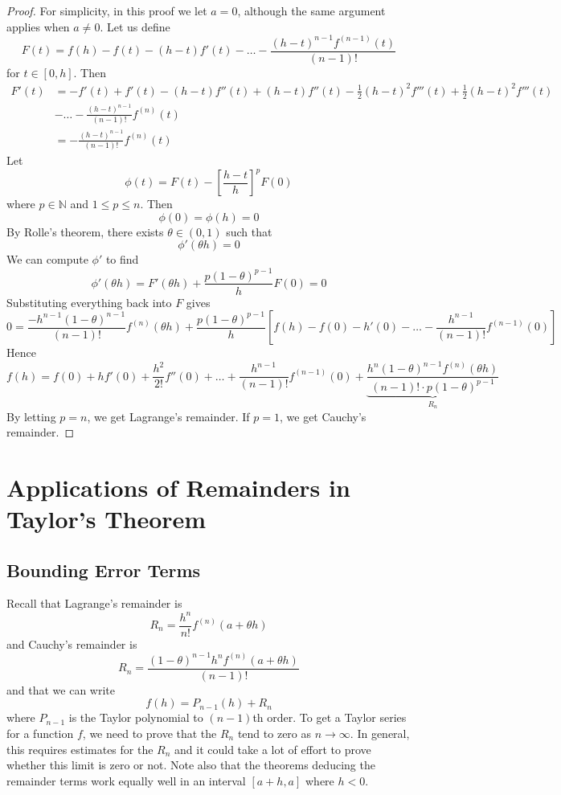 \documentclass{article}
\begin{document}
\begin{proof}
	For simplicity, in this proof we let $a = 0$, although the same argument applies when $a \neq 0$. Let us define
	\[ F(t) = f(h) - f(t) - (h-t)f'(t) - \dots - \frac{(h-t)^{n-1}f^{(n-1)}(t)}{(n-1)!} \]
	for $t \in [0, h]$. Then
	\begin{align*}
		F'(t) & = -f'(t) + f'(t) - (h-t)f''(t) + (h-t)f''(t) - \frac{1}{2} (h-t)^2f'''(t) + \frac{1}{2} (h-t)^2f'''(t) \\
		      & - \dots - \frac{(h-t)^{n-1}}{(n-1)!}f^{(n)}(t)                                                         \\
		      & = - \frac{(h-t)^{n-1}}{(n-1)!}f^{(n)}(t)
	\end{align*}
	Let
	\[ \phi(t) = F(t) - \left[ \frac{h-t}{h} \right]^p F(0) \]
	where $p \in \mathbb N$ and $1 \leq p \leq n$. Then
	\[ \phi(0) = \phi(h) = 0 \]
	By Rolle's theorem, there exists $\theta \in (0, 1)$ such that
	\[ \phi'(\theta h) = 0 \]
	We can compute $\phi'$ to find
	\[ \phi'(\theta h) = F'(\theta h) + \frac{p(1-\theta)^{p-1}}{h} F(0) = 0 \]
	Substituting everything back into $F$ gives
	\[ 0 = \frac{-h^{n-1}(1-\theta)^{n-1}}{(n-1)!}f^{(n)}(\theta h) + \frac{p(1-\theta)^{p-1}}{h}\left[ f(h) - f(0) - h'(0) - \dots - \frac{h^{n-1}}{(n-1)!}f^{(n-1)}(0) \right] \]
	Hence
	\[ f(h) = f(0) + hf'(0) + \frac{h^2}{2!} f''(0) + \dots + \frac{h^{n-1}}{(n-1)!}f^{(n-1)}(0) + \underbrace{\frac{h^n(1 - \theta)^{n-1}f^{(n)}(\theta h)}{(n-1)!\cdot p(1-\theta)^{p-1}}}_{R_n} \]
	By letting $p = n$, we get Lagrange's remainder. If $p=1$, we get Cauchy's remainder.
\end{proof}

\section{Applications of Remainders in Taylor's Theorem}
\subsection{Bounding Error Terms}
Recall that Lagrange's remainder is
\[ R_n = \frac{h^n}{n!}f^{(n)}(a + \theta h) \]
and Cauchy's remainder is
\[ R_n = \frac{(1 - \theta)^{n-1}h^nf^{(n)}(a + \theta h)}{(n-1)!} \]
and that we can write
\[ f(h) = P_{n-1}(h) + R_n \]
where $P_{n-1}$ is the Taylor polynomial to $(n-1)$th order. To get a Taylor series for a function $f$, we need to prove that the $R_n$ tend to zero as $n \to \infty$. In general, this requires estimates for the $R_n$ and it could take a lot of effort to prove whether this limit is zero or not. Note also that the theorems deducing the remainder terms work equally well in an interval $[a+h, a]$ where $h < 0$.
\end{document}
